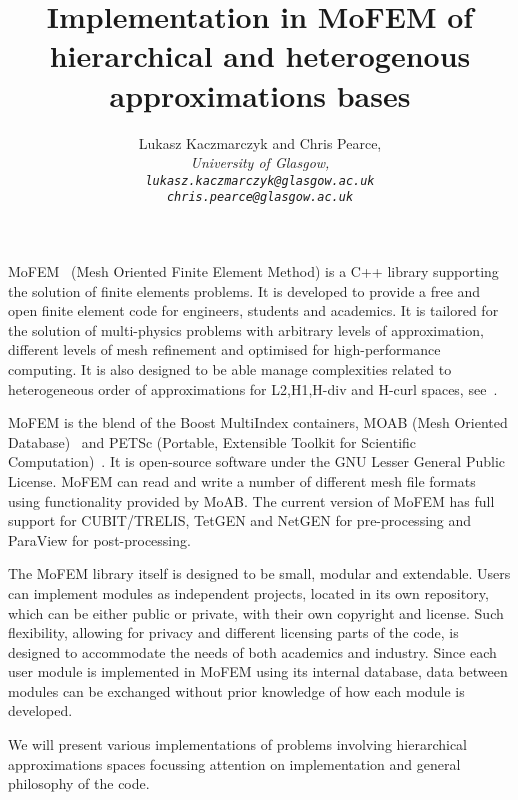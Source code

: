 \documentclass{article}
\begin{document}
\title{Implementation in MoFEM of hierarchical and heterogenous approximations bases}
\author{%
  Lukasz Kaczmarczyk and Chris Pearce,\\
  \em{University of Glasgow},\\
  \texttt{lukasz.kaczmarczyk@glasgow.ac.uk}\\
  \texttt{chris.pearce@glasgow.ac.uk}\\
}
\maketitle

MoFEM~\cite{MoFEMWebPage} (Mesh Oriented Finite Element Method) is a C++ library
supporting the solution of finite elements problems. It is developed to provide
a free and open  finite element code for engineers, students and academics. It
is tailored for the solution of multi-physics problems with arbitrary levels of
approximation, different levels of mesh refinement and optimised for
high-performance computing. It is also designed to be able manage complexities
related to heterogeneous order of approximations for L2,H1,H-div and H-curl
spaces, see~\cite{ainsworth2001essential}.

MoFEM is the blend of the Boost MultiIndex containers, MOAB (Mesh Oriented
Database)~\cite{tautges2010canonical} and PETSc (Portable, Extensible Toolkit
for Scientific Computation)~\cite{petsc-web-page}. It is open-source software
under the GNU Lesser General Public License. MoFEM can read and write a number
of different mesh file formats using functionality provided by MoAB. The current
version of MoFEM has full support for CUBIT/TRELIS, TetGEN and NetGEN for
pre-processing and ParaView for post-processing.

The MoFEM library itself is designed to be small, modular and extendable. Users
can implement modules as independent projects, located in its own repository,
which can be either public or private, with their own copyright and license.
Such flexibility, allowing for privacy and different licensing parts of the
code, is designed to accommodate the needs of both academics and industry. Since
each user module is implemented in MoFEM using its internal database, data
between modules can be exchanged without prior knowledge of how each module is
developed.

We will present various implementations of problems involving hierarchical
approximations spaces focussing attention on implementation and general
philosophy of the code.

%

{}

\end{document}
